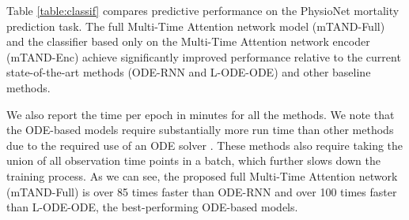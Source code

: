Table \ref{table:classif} compares predictive performance on the PhysioNet mortality prediction task. The full Multi-Time Attention network model (mTAND-Full) and the classifier based only on the Multi-Time Attention network encoder (mTAND-Enc) achieve significantly improved performance relative to the current state-of-the-art methods (ODE-RNN and L-ODE-ODE) and other baseline methods. 

We also report the time per epoch in minutes for all the methods. We note that the ODE-based models require substantially more run time than other methods due to the required use of an ODE solver \citep{neural_ode2018, Rubanova2019}. These methods also require taking the union of all observation time points in a batch, which further slows down the training process. As we can see, the proposed full Multi-Time Attention network (mTAND-Full) is over 85 times faster than ODE-RNN and over 100 times faster than L-ODE-ODE, the best-performing ODE-based models.









